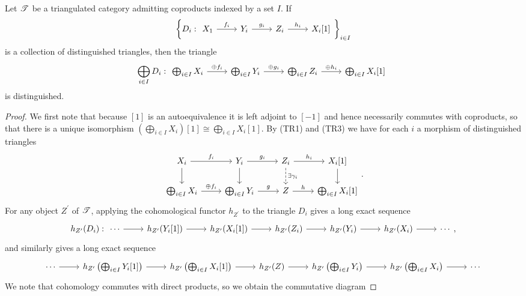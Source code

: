 \documentclass[dissertation.tex]{subfiles}
\begin{document}
\begin{prop}\label{sumtriangles}
  Let $\mathscr{T}$ be a triangulated category admitting coproducts indexed by a set $I$.
  If 
  $$\left\{D_i : \begin{tikzcd}X_1 \arrow{r}{f_i} & Y_i \arrow{r}{g_i} & Z_i\arrow{r}{h_i} & X_i[1]\end{tikzcd}\right\}_{i\in I}$$ 
  is a collection of distinguished triangles, then the triangle 
  $$\bigoplus_{i \in I} D_i : \begin{tikzcd} \bigoplus_{i \in I} X_i \arrow{r}{\oplus f_i} & \bigoplus_{i \in I}Y_i \arrow{r}{\oplus g_i} & \bigoplus_{i \in I} Z_i \arrow{r}{\oplus h_i} & \bigoplus_{i \in I} X_i[1]\end{tikzcd}$$
  is distinguished.

  \begin{proof}
    We first note that because $[1]$ is an autoequivalence it is left adjoint to $[-1]$ and hence necessarily commutes with coproducts, so that there is a unique isomorphism $\left(\bigoplus_{i \in I}X_i\right)[1] \cong \bigoplus_{i \in I}X_i[1]$.
    By (TR1) and (TR3) we have for each $i$ a morphism of distinguished triangles
    $$\begin{tikzcd} 
      X_i \arrow{r}{f_i}\arrow{d} & Y_i\arrow{d}\arrow{r}{g_i} & Z_i \arrow[dashed]{d}{\exists \gamma_i}\arrow{r}{h_i} & X_i[1] \arrow{d}\\
      \bigoplus_{i \in I} X_i \arrow{r}{\oplus f_i} & \bigoplus_{i \in I}Y_i \arrow{r}{g} & Z \arrow{r}{h} & \bigoplus_{i \in I} X_i[1]
    \end{tikzcd}.$$
    For any object $Z^\prime$ of $\mathscr{T}$, applying the cohomological functor $h_{Z^\prime}$ to the triangle $D_i$ gives a long exact sequence
    $$h_{Z^\prime}(D_i) : 
    \begin{tikzcd} 
      \cdots \arrow{r} & h_{Z^\prime}(Y_i[1]) \arrow{r} & h_{Z^\prime}(X_i[1]) \arrow{r} & h_{Z^\prime}(Z_i) \arrow{r} & h_{Z^\prime}(Y_i) \arrow{r} & h_{Z^\prime}(X_i) \arrow{r} & \cdots
    \end{tikzcd},$$
    and similarly gives a long exact sequence
    $$\begin{tikzcd}
      \cdots \arrow{r} & h_{Z^\prime}\left(\bigoplus_{i \in I}Y_i[1]\right) \arrow{r} & h_{Z^\prime}\left(\bigoplus_{i \in I}X_i[1]\right) \arrow{r} & h_{Z^\prime}(Z) \arrow{r} & h_{Z^\prime}\left(\bigoplus_{i \in I}Y_i\right) \arrow{r} & h_{Z^\prime}\left(\bigoplus_{i \in I} X_i\right) \arrow{r} & \cdots
    \end{tikzcd}$$
    We note that cohomology commutes with direct products, so we obtain the commutative diagram

\end{proof}
\end{prop}
\end{document}

